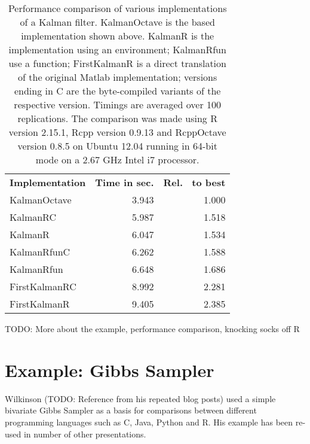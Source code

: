 \begin{table}[hbt]
  \begin{center}
    \begin{small}
      \begin{tabular}{lrr}
        \toprule
        {\bf Implementation \phantom{XX}} & {\bf Time in sec.} & {\bf Rel.~ to best} \\
        \cmidrule(r){1-3}
         KalmanOctave  & 3.943 & 1.000 \\
             KalmanRC  & 5.987 & 1.518 \\
              KalmanR  & 6.047 & 1.534 \\
          KalmanRfunC  & 6.262 & 1.588 \\
           KalmanRfun  & 6.648 & 1.686 \\
        FirstKalmanRC  & 8.992 & 2.281 \\
         FirstKalmanR  & 9.405 & 2.385 \\
        \bottomrule 
      \end{tabular}
      \caption{Performance comparison of various implementations of a Kalman filter.
        KalmanOctave is the  based implementation shown above.
        KalmanR is the \R implementation using an environment; KalmanRfun use a
        function; FirstKalmanR is a direct translation of the original Matlab
        implementation; versions ending in C are the byte-compiled variants of
        the respective version.  Timings are averaged over 100 replications.
        The comparison was made using R version 2.15.1, Rcpp version 0.9.13 and
        RcppOctave version 0.8.5 on Ubuntu 12.04 running in 64-bit mode on a
        2.67 GHz Intel i7 processor.}
      \label{tab:benchmark}
    \end{small}
  \end{center}
\end{table}


TODO: More about the example, performance comparison, knocking socks off R


\section{Example: Gibbs Sampler}

Wilkinson (TODO: Reference from his repeated blog posts) used a simple
bivariate Gibbs Sampler as a basis for comparisons between different
programming languages such as C, Java, Python and R. His example has been
re-used in number of other presentations.  

